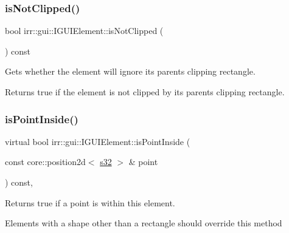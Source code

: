 \subsubsection{\texorpdfstring{is\+Not\+Clipped()}{isNotClipped()}}
{\footnotesize\ttfamily bool irr\+::gui\+::\+I\+G\+U\+I\+Element\+::is\+Not\+Clipped (\begin{DoxyParamCaption}{ }\end{DoxyParamCaption}) const\hspace{0.3cm}{\ttfamily [inline]}}



Gets whether the element will ignore its parent\textquotesingle{}s clipping rectangle. 

\begin{DoxyReturn}{Returns}
true if the element is not clipped by its parent\textquotesingle{}s clipping rectangle. 
\end{DoxyReturn}
\mbox{\label{classirr_1_1gui_1_1IGUIElement_a1aaf30a10b77f192dda8c548c109de89}} 
\subsubsection{\texorpdfstring{is\+Point\+Inside()}{isPointInside()}}
{\footnotesize\ttfamily virtual bool irr\+::gui\+::\+I\+G\+U\+I\+Element\+::is\+Point\+Inside (\begin{DoxyParamCaption}\item[{const core\+::position2d$<$ \hyperlink{namespaceirr_ac66849b7a6ed16e30ebede579f9b47c6}{s32} $>$ \&}]{point }\end{DoxyParamCaption}) const\hspace{0.3cm}{\ttfamily [inline]}, {\ttfamily [virtual]}}



Returns true if a point is within this element. 

Elements with a shape other than a rectangle should override this method \mbox{\label{classirr_1_1gui_1_1IGUIElement_a9b1880048e7542dbe289295de69e77cd}} 
